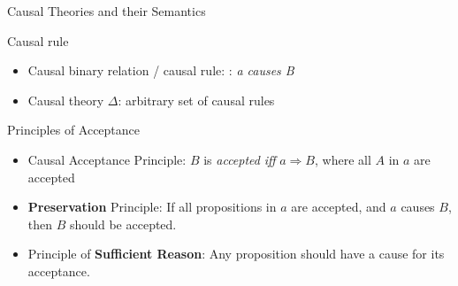 \documentclass{beamer} %
\begin{document}
\begin{frame}{Causal Theories and their Semantics}
    \begin{block}{Causal rule}
        \begin{itemize}
            \item Causal binary relation / causal rule: : \textit{a causes B}
            \item Causal theory \( \Delta \): arbitrary set of causal rules 
        \end{itemize}
    \end{block}
    
    \begin{block}{Principles of Acceptance}
        \begin{itemize}
            \item Causal Acceptance Principle: $B$ is \emph{accepted} \emph{iff} $a \Rightarrow B$, where all $A$ in $a$ are accepted
            \item \textbf{Preservation} Principle: If all propositions in $a$ are accepted, and $a$ causes $B$, then $B$ should be accepted.
            \item Principle of \textbf{Sufficient Reason}: Any proposition should have a cause for its acceptance.
        \end{itemize}
    \end{block}
\end{frame}
\end{document}
